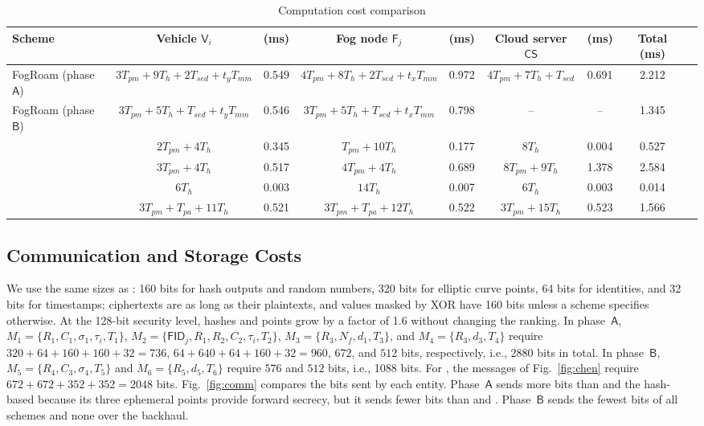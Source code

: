 \documentclass[journal]{IEEEtran}
\theoremstyle{plain}
\theoremstyle{definition}
\newcommand{\Veh}{\mathsf{V}}            %
\newcommand{\Fog}{\mathsf{F}}            %
\newcommand{\CS}{\mathsf{CS}}            %
\newcommand{\FID}{\mathsf{FID}}          %
\newcommand{\Tpm}{T_{pm}}                %
\newcommand{\Tpa}{T_{pa}}
\newcommand{\Th}{T_{h}}
\newcommand{\Tsed}{T_{sed}}
\newcommand{\Tmm}{T_{mm}}
\newcommand{\protocol}{\textsf{FogRoam}}   %
\begin{document}
\begin{table}[!t]
\centering
\caption{Computation cost comparison}
\label{tab:comp}
\footnotesize
\setlength{\tabcolsep}{4pt}
\begin{tabular}{@{}lcccccccc@{}}
\toprule
\textbf{Scheme} & \textbf{Vehicle $\Veh_i$} & \textbf{(ms)} & \textbf{Fog node $\Fog_j$} & \textbf{(ms)} & \textbf{Cloud server $\CS$} & \textbf{(ms)} & \textbf{Total (ms)}\\
\midrule
{\protocol} (phase $\mathsf{A}$) & $3\Tpm+9\Th+2\Tsed+t_y\Tmm$ & 0.549 & $4\Tpm+8\Th+2\Tsed+t_x\Tmm$ & 0.972 & $4\Tpm+7\Th+\Tsed$ & 0.691 & 2.212\\
{\protocol} (phase $\mathsf{B}$) & $3\Tpm+5\Th+\Tsed+t_y\Tmm$ & 0.546 & $3\Tpm+5\Th+\Tsed+t_x\Tmm$ & 0.798 & -- & -- & 1.345\\
\cite{chen2024provably} & $2\Tpm+4\Th$ & 0.345 & $\Tpm+10\Th$ & 0.177 & $8\Th$ & 0.004 & 0.527\\
\cite{ma2019efficient} & $3\Tpm+4\Th$ & 0.517 & $4\Tpm+4\Th$ & 0.689 & $8\Tpm+9\Th$ & 1.378 & 2.584\\
\cite{wazid2019akm} & $6\Th$ & 0.003 & $14\Th$ & 0.007 & $6\Th$ & 0.003 & 0.014\\
\cite{eftekhari2021security} & $3\Tpm+\Tpa+11\Th$ & 0.521 & $3\Tpm+\Tpa+12\Th$ & 0.522 & $3\Tpm+15\Th$ & 0.523 & 1.566\\
\bottomrule
\end{tabular}
\end{table}

\subsection{Communication and Storage Costs}
We use the same sizes as \cite{chen2024provably}: 160 bits for hash outputs and random numbers, 320 bits for elliptic curve points, 64 bits for identities, and 32 bits for timestamps; ciphertexts are as long as their plaintexts, and values masked by XOR have 160 bits unless a scheme specifies otherwise. At the 128-bit security level, hashes and points grow by a factor of 1.6 without changing the ranking. In phase~$\mathsf{A}$, $M_1=\{R_1,C_1,\sigma_1,\tau_i,T_1\}$, $M_2=\{\FID_j,R_1,R_2,C_2,\tau_i,T_2\}$, $M_3=\{R_3,N_f,d_1,T_3\}$, and $M_4=\{R_3,d_3,T_4\}$ require $320+64+160+160+32=736$, $64+640+64+160+32=960$, $672$, and $512$ bits, respectively, i.e., 2880 bits in total. In phase~$\mathsf{B}$, $M_5=\{R_4,C_3,\sigma_4,T_5\}$ and $M_6=\{R_5,d_5,T_6\}$ require $576$ and $512$ bits, i.e., 1088 bits. For \cite{chen2024provably}, the messages of Fig.~\ref{fig:chen} require $672+672+352+352=2048$ bits. Fig.~\ref{fig:comm} compares the bits sent by each entity. Phase~$\mathsf{A}$ sends more bits than \cite{chen2024provably} and the hash-based \cite{wazid2019akm} because its three ephemeral points provide forward secrecy, but it sends fewer bits than \cite{ma2019efficient} and \cite{eftekhari2021security}. Phase~$\mathsf{B}$ sends the fewest bits of all schemes and none over the backhaul.
\end{document}
